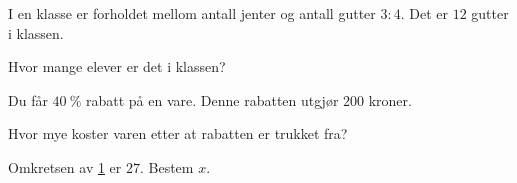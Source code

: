 \Oppgave[1] 

I en klasse er forholdet mellom antall jenter og antall gutter $3:4$.
Det er $12$ gutter i klassen. \bigskip

Hvor mange elever er det i klassen?


\Oppgave[1] 

Du får $\SI{40}{\percent}$ rabatt på en vare. Denne rabatten utgjør $200$
kroner.\bigskip

Hvor mye koster varen etter at rabatten er trukket fra?


\Oppgave[1] 

\begin{figure}[H]
  \centering
  \caption{}
  \label{fig:Forkurs-1p-2p-laererutdanning-2016-V-oppgave-1-4}
\end{figure}

Omkretsen av \cref{fig:Forkurs-1p-2p-laererutdanning-2016-V-oppgave-1-4} er
$27$. Bestem $x$.


